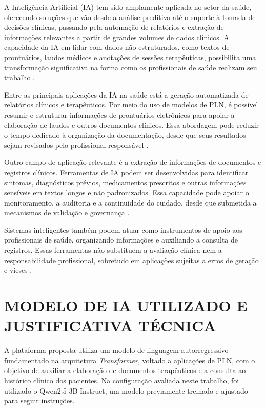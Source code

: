 A Inteligência Artificial (IA) tem sido amplamente aplicada no setor da saúde, oferecendo soluções que vão desde a análise preditiva até o suporte à tomada de decisões clínicas, passando pela automação de relatórios e extração de informações relevantes a partir de grandes volumes de dados clínicos. A capacidade da IA em lidar com dados não estruturados, como textos de prontuários, laudos médicos e anotações de sessões terapêuticas, possibilita uma transformação significativa na forma como os profissionais de saúde realizam seu trabalho \cite{brasil2022inteligencia}.

Entre as principais aplicações da IA na saúde está a geração automatizada de relatórios clínicos e terapêuticos. Por meio do uso de modelos de PLN, é possível resumir e estruturar informações de prontuários eletrônicos para apoiar a elaboração de laudos e outros documentos clínicos. Essa abordagem pode reduzir o tempo dedicado à organização da documentação, desde que seus resultados sejam revisados pelo profissional responsável \cite{silva2021aplicacao}.

Outro campo de aplicação relevante é a extração de informações de documentos e registros clínicos. Ferramentas de IA podem ser desenvolvidas para identificar sintomas, diagnósticos prévios, medicamentos prescritos e outras informações sensíveis em textos longos e não padronizados. Essa capacidade pode apoiar o monitoramento, a auditoria e a continuidade do cuidado, desde que submetida a mecanismos de validação e governança \cite{brasil2022inteligencia}.

Sistemas inteligentes também podem atuar como instrumentos de apoio aos profissionais de saúde, organizando informações e auxiliando a consulta de registros. Essas ferramentas não substituem a avaliação clínica nem a responsabilidade profissional, sobretudo em aplicações sujeitas a erros de geração e vieses \cite{conass2020inteligencia}.

\section{MODELO DE IA UTILIZADO E JUSTIFICATIVA TÉCNICA}

\iffalse
A plataforma proposta utiliza um modelo de linguagem autorregressivo fundamentado na arquitetura \textit{Transformer}, voltado a aplicações de PLN, com o objetivo de auxiliar a elaboração de documentos terapêuticos e a consulta ao histórico clínico dos pacientes. Na configuração avaliada neste trabalho, foi utilizado o Qwen2.5-3B-Instruct, um modelo previamente treinado e ajustado para seguir instruções.

